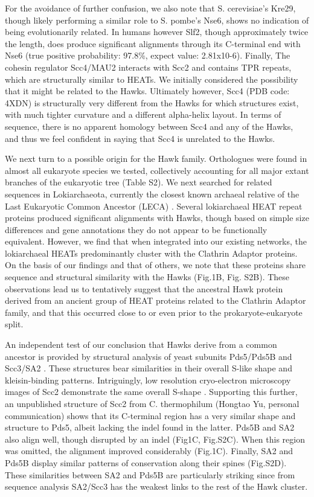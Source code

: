 \documentclass[a4paper,11pt,twoside,openright]{scrbook}
\begin{document}
For the avoidance of further confusion, we also note that S. cerevisiae’s Kre29, though likely performing a similar role to S. pombe’s Nse6, shows no indication of being evolutionarily related. In humans however Slf2, though approximately twice the length, does produce significant alignments through its C-terminal end with Nse6 (true positive probability: 97.8\%, expect value: 2.81x10-6). Finally, The cohesin regulator Scc4/MAU2 interacts with Scc2 and contains TPR repeats, which are structurally similar to HEATs. We initially considered the possibility that it might be related to the Hawks. Ultimately however, Scc4 (PDB code: 4XDN) is structurally very different from the Hawks for which structures exist, with much tighter curvature and a different alpha-helix layout. In terms of sequence, there is no apparent homology between Scc4 and any of the Hawks, and thus we feel confident in saying that Scc4 is unrelated to the Hawks.

We next turn to a possible origin for the Hawk family. Orthologues were found in almost all eukaryote species we tested, collectively accounting for all major extant branches of the eukaryotic tree (Table S2). We next searched for related sequences in Lokiarchaeota, currently the closest known archaeal relative of the Last Eukaryotic Common Ancestor \cite{Spang2015} (LECA) . Several lokiarchaeal HEAT repeat proteins produced significant alignments with Hawks, though based on simple size differences and gene annotations they do not appear to be functionally equivalent. However, we find that when integrated into our existing networks, the lokiarchaeal HEATs predominantly cluster with the Clathrin Adaptor proteins. On the basis of our findings and that of others, we note that these proteins share sequence and structural similarity with the Hawks \cite{Neuwald2000} (Fig.1B, Fig. S2B). These observations lead us to tentatively suggest that the ancestral Hawk protein derived from an ancient group of HEAT proteins related to the Clathrin Adaptor family, and that this occurred close to or even prior to the prokaryote-eukaryote split.

An independent test of our conclusion that Hawks derive from a common ancestor is provided by structural analysis of yeast subunits Pds5/Pds5B \cite{Hara2014} and Scc3/SA2 \cite{Ouyang2016}. These structures bear similarities in their overall S-like shape and kleisin-binding patterns. Intriguingly, low resolution cryo-electron microscopy images of Scc2 demonstrate the same overall S-shape \cite{Chao2015}. Supporting this further, an unpublished structure of Scc2 from C. thermophilum (Hongtao Yu, personal communication) shows that its C-terminal region has a very similar shape and structure to Pds5, albeit lacking the indel found in the latter. Pds5B and SA2 also align well, though disrupted by an indel \cite{Lee2016} (Fig1C, Fig.S2C). When this region was omitted, the alignment improved considerably (Fig.1C). Finally, SA2 and Pds5B display similar patterns of conservation along their spines (Fig.S2D). These similarities between SA2 and Pds5B are particularly striking since from sequence analysis SA2/Scc3 has the weakest links to the rest of the Hawk cluster.
\end{document}
